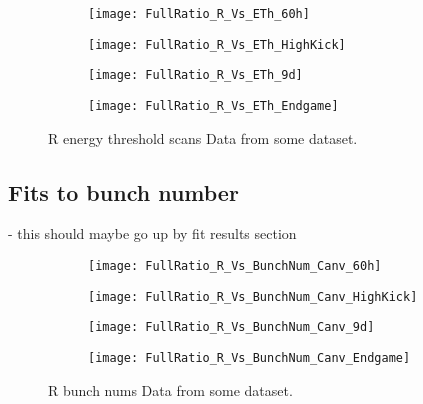 \begin{figure}[]
\centering
    \begin{subfigure}[]{0.45\textwidth}
        \centering
        \texttt{[image: FullRatio\_R\_Vs\_ETh\_60h]}
        \caption{}
    \end{subfigure}%
    \begin{subfigure}[]{0.45\textwidth}
        \centering
        \texttt{[image: FullRatio\_R\_Vs\_ETh\_HighKick]}
        \caption{}
    \end{subfigure}

    \begin{subfigure}[]{0.45\textwidth}
        \centering
        \texttt{[image: FullRatio\_R\_Vs\_ETh\_9d]}
        \caption{}
    \end{subfigure}%
    \begin{subfigure}[]{0.45\textwidth}
        \centering
        \texttt{[image: FullRatio\_R\_Vs\_ETh\_Endgame]}
        \caption{}
    \end{subfigure}
\caption[]{R energy threshold scans Data from some dataset.}
\label{fig:}
\end{figure}





\subsection{Fits to bunch number}

- this should maybe go up by fit results section


\begin{figure}[]
\centering
    \begin{subfigure}[]{0.45\textwidth}
        \centering
        \texttt{[image: FullRatio\_R\_Vs\_BunchNum\_Canv\_60h]}
        \caption{}
    \end{subfigure}%
    \begin{subfigure}[]{0.45\textwidth}
        \centering
        \texttt{[image: FullRatio\_R\_Vs\_BunchNum\_Canv\_HighKick]}
        \caption{}
    \end{subfigure}

    \begin{subfigure}[]{0.45\textwidth}
        \centering
        \texttt{[image: FullRatio\_R\_Vs\_BunchNum\_Canv\_9d]}
        \caption{}
    \end{subfigure}%
    \begin{subfigure}[]{0.45\textwidth}
        \centering
        \texttt{[image: FullRatio\_R\_Vs\_BunchNum\_Canv\_Endgame]}
        \caption{}
    \end{subfigure}
\caption[]{R bunch nums Data from some dataset.}
\label{fig:}
\end{figure}



